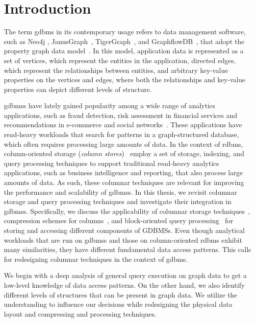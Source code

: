 
\chapter{Introduction}
\label{introduction}

The term \gls{gdbms} in its contemporary usage refers to data management software, such as Neo4j \cite{neo4j}, JanusGraph~\cite{janusgraph}, TigerGraph~\cite{tigergraph}, and GraphflowDB~\cite{kankanamge:graphflow, mhedhbi:sqs}, that adopt the property graph data model~\cite{neo4j-property-graph-model}. In this model, application data is represented as a set of vertices, which represent the entities in the application, directed edges, which represent the relationships between entities, and arbitrary key-value properties on the vertices and edges, where both the relationships and key-value properties can depict different levels of structure.

\gls{gdbms}s have lately gained popularity among a wide range of analytics applications, such as fraud detection, risk assessment in financial services and recommendations in e-commerce and social networks~\cite{sahu:survey}. These applications have read-heavy workloads that search for patterns in a graph-structured database, which often requires processing large amounts of data. In the context of \gls{rdbms}, column-oriented storage ({\em column stores})~\cite{monet-2decades, oracle-col, c-store, boncz-vectorwise} employ a set of storage, indexing, and query processing techniques to support traditional read-heavy analytics applications, such as business intelligence and reporting, that also process large amounts of data. As such, these columnar techniques are relevant for improving the performance and scalability of \gls{gdbms}s. In this thesis, we revisit columnar storage and query processing techniques and investigate their integration in \gls{gdbms}s. Specifically, we discuss the applicability of columnar storage techniques~\cite{c-store}, compression schemes for columns~\cite{abadi-col-comp, abadi-sparse-col, boncz-comp}, and block-oriented query processing~\cite{boncz-monet-vectorized, col-vs-row} for storing and accessing different components of GDBMSs. Even though analytical workloads that are run on \gls{gdbms}s and those on column-oriented \gls{rdbms} exhibit many similarities, they have different fundamental data access patterns. This calls for redesigning columnar techniques in the context of \gls{gdbms}.

We begin with a deep analysis of general query execution on graph data to get a low-level knowledge of data access patterns. On the other hand, we also identify different levels of structures that can be present in graph data. We utilize the understanding to influence our decisions while redesigning the physical data layout and compressing and processing techniques. 

